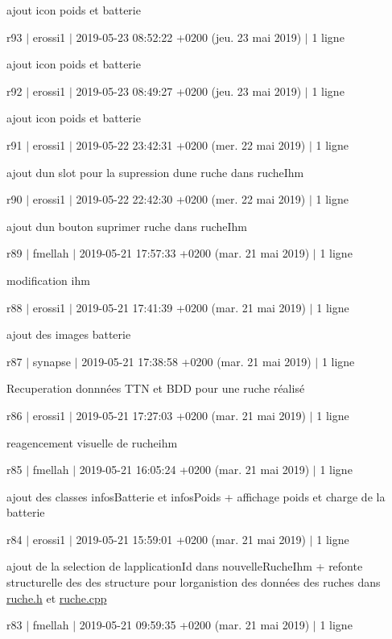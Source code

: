 ajout icon poids et batterie

r93 $\vert$ erossi1 $\vert$ 2019-\/05-\/23 08\+:52\+:22 +0200 (jeu. 23 mai 2019) $\vert$ 1 ligne

ajout icon poids et batterie

r92 $\vert$ erossi1 $\vert$ 2019-\/05-\/23 08\+:49\+:27 +0200 (jeu. 23 mai 2019) $\vert$ 1 ligne

ajout icon poids et batterie

r91 $\vert$ erossi1 $\vert$ 2019-\/05-\/22 23\+:42\+:31 +0200 (mer. 22 mai 2019) $\vert$ 1 ligne

ajout d\textquotesingle{}un slot pour la supression d\textquotesingle{}une ruche dans ruche\+Ihm

r90 $\vert$ erossi1 $\vert$ 2019-\/05-\/22 22\+:42\+:30 +0200 (mer. 22 mai 2019) $\vert$ 1 ligne

ajout d\textquotesingle{}un bouton suprimer ruche dans ruche\+Ihm

r89 $\vert$ fmellah $\vert$ 2019-\/05-\/21 17\+:57\+:33 +0200 (mar. 21 mai 2019) $\vert$ 1 ligne

modification ihm

r88 $\vert$ erossi1 $\vert$ 2019-\/05-\/21 17\+:41\+:39 +0200 (mar. 21 mai 2019) $\vert$ 1 ligne

ajout des images batterie

r87 $\vert$ synapse $\vert$ 2019-\/05-\/21 17\+:38\+:58 +0200 (mar. 21 mai 2019) $\vert$ 1 ligne

Recuperation donnnées T\+TN et B\+DD pour une ruche réalisé

r86 $\vert$ erossi1 $\vert$ 2019-\/05-\/21 17\+:27\+:03 +0200 (mar. 21 mai 2019) $\vert$ 1 ligne

reagencement visuelle de rucheihm

r85 $\vert$ fmellah $\vert$ 2019-\/05-\/21 16\+:05\+:24 +0200 (mar. 21 mai 2019) $\vert$ 1 ligne

ajout des classes infos\+Batterie et infos\+Poids + affichage poids et charge de la batterie

r84 $\vert$ erossi1 $\vert$ 2019-\/05-\/21 15\+:59\+:01 +0200 (mar. 21 mai 2019) $\vert$ 1 ligne

ajout de la selection de lapplication\+Id dans nouvelle\+Ruche\+Ihm + refonte structurelle des des structure pour l\textquotesingle{}organistion des données des ruches dans \hyperlink{ruche_8h}{ruche.\+h} et \hyperlink{ruche_8cpp}{ruche.\+cpp}

r83 $\vert$ fmellah $\vert$ 2019-\/05-\/21 09\+:59\+:35 +0200 (mar. 21 mai 2019) $\vert$ 1 ligne

